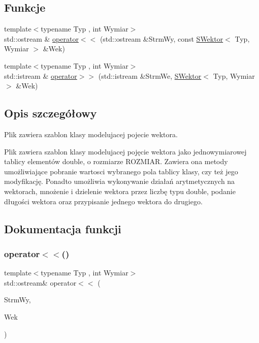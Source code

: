 \subsection*{Funkcje}
\begin{DoxyCompactItemize}
\item 
{\footnotesize template$<$typename Typ , int Wymiar$>$ }\\std\+::ostream \& \hyperlink{SWektor_8hh_ac64bafa5b2d6cbab2daf26c794783b99}{operator$<$$<$} (std\+::ostream \&Strm\+Wy, const \hyperlink{classSWektor}{S\+Wektor}$<$ Typ, Wymiar $>$ \&Wek)
\item 
{\footnotesize template$<$typename Typ , int Wymiar$>$ }\\std\+::istream \& \hyperlink{SWektor_8hh_a3f97e20d3fc20a4fee82eb8515b49e94}{operator$>$$>$} (std\+::istream \&Strm\+We, \hyperlink{classSWektor}{S\+Wektor}$<$ Typ, Wymiar $>$ \&Wek)
\end{DoxyCompactItemize}


\subsection{Opis szczegółowy}
Plik zawiera szablon klasy modelujacej pojecie wektora. 

Plik zawiera szablon klasy modelujacej pojęcie wektora jako jednowymiarowej tablicy elementów double, o rozmiarze R\+O\+Z\+M\+I\+AR. Zawiera ona metody umożliwiające pobranie wartosci wybranego pola tablicy klasy, czy też jego modyfikację. Ponadto umożliwia wykonywanie działań arytmetycznych na wektorach, mnożenie i dzielenie wektora przez liczbę typu double, podanie długości wektora oraz przypisanie jednego wektora do drugiego. 

\subsection{Dokumentacja funkcji}
\mbox{\label{SWektor_8hh_ac64bafa5b2d6cbab2daf26c794783b99}} 
\subsubsection{\texorpdfstring{operator$<$$<$()}{operator<<()}}
{\footnotesize\ttfamily template$<$typename Typ , int Wymiar$>$ \\
std\+::ostream\& operator$<$$<$ (\begin{DoxyParamCaption}\item[{std\+::ostream \&}]{Strm\+Wy,  }\item[{const \hyperlink{classSWektor}{S\+Wektor}$<$ Typ, Wymiar $>$ \&}]{Wek }\end{DoxyParamCaption})}

